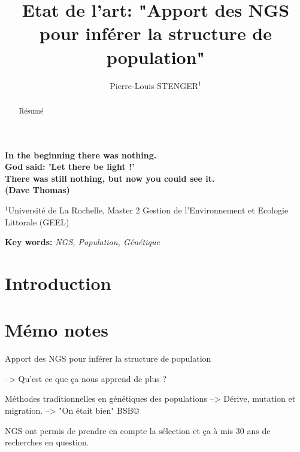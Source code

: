 \documentclass[a4paper]{article}
\title{Etat de l'art: "Apport des NGS pour inférer la structure de population"}
\author{Pierre-Louis STENGER$^{1}$}
\date{}                       %
\newlength{\SSFBox}
\newlength{\EFBox}
\newenvironment{BCouleur}[1][]{%
\setkeys{BCouleur}{#1}
  \def\FrameCommand{\fboxrule=\FrameRule \fboxsep=\FrameSep \color{\CTexte}\fcolorbox{\CBord}{\CFond}}
\setlength{\SSFBox}{\SFBox}
\setlength\FrameSep{\the\SSFBox}
  \setlength{\EFBox}{\EpaisFBox}
\setlength\FrameRule{\the\EFBox}
  \MakeFramed{\advance\hsize-\width \FrameRestore}}%
  {\endMakeFramed}
\begin{document}
	
\begin{cursive}
\textbf{In the beginning there was nothing.
\\
God said: 'Let there be light !'
\\
There was still nothing, but now you could see it.
\\
(Dave Thomas)}
\end{cursive}

\newpage

\maketitle     
                                                   
$^{1}$Université de La Rochelle, Master 2 Gestion de l'Environnement et Ecologie Littorale (GEEL)

\begin{BCouleur}  %


\begin{abstract}
Résumé
\end{abstract}


\end{BCouleur} %

\textbf{Key words:} \textit{NGS, Population, Génétique}

\section*{Introduction}      

\section{Mémo notes}

Apport des NGS pour inférer la structure de population

--> Qu'est ce que ça nous apprend de plus ?

Méthodes traditionnelles en génétiques des populations --> Dérive, mutation et migration. --> "On était bien" BSB\copyright

NGS ont permis de prendre en compte la sélection et ça à mis 30 ans de recherches en question.
\end{document}
